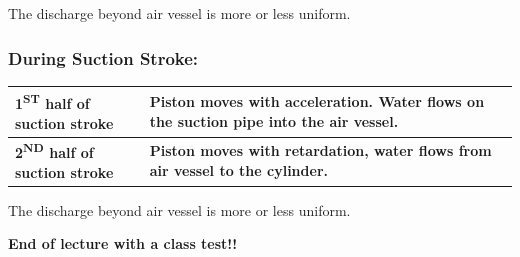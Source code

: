 \documentclass{article}
\begin{document}
    The discharge beyond air vessel is more or less uniform.

    \subsubsection*{During Suction Stroke:}


    \begin{table}[ht]
      \centering
      \renewcommand{\arraystretch}{2.5} 
      \begin{tabularx}{\textwidth}{>{\hsize=0.4\hsize\centering\arraybackslash}X>{\hsize=0.6\hsize\centering\arraybackslash}X}
        \hline
        \textbf{1\textsuperscript{ST} half of suction stroke} & \textbf{Piston moves with acceleration. Water flows on the suction pipe into the air vessel.} \\
        \hline
        \textbf{2\textsuperscript{ND} half of suction stroke} & \textbf{Piston moves with retardation, water flows from air vessel to the cylinder.} \\
        \hline
      \end{tabularx}
    \end{table}

    The discharge beyond air vessel is more or less uniform.

    \vspace*{1cm}
    \textbf{End of lecture with a class test!! }
    \hrulefill
\end{document}
